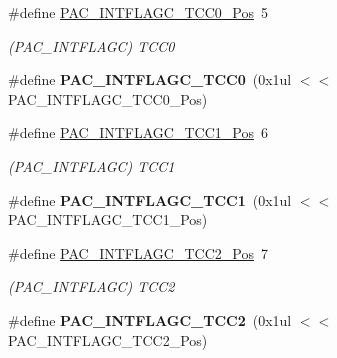 \begin{DoxyCompactItemize}
\item 
\hypertarget{group___s_a_m_l21___p_a_c_gab022b3b9482bc40aca6b6c4abebaa0b5}{}\#define \hyperlink{group___s_a_m_l21___p_a_c_gab022b3b9482bc40aca6b6c4abebaa0b5}{P\+A\+C\+\_\+\+I\+N\+T\+F\+L\+A\+G\+C\+\_\+\+T\+C\+C0\+\_\+\+Pos}~5\label{group___s_a_m_l21___p_a_c_gab022b3b9482bc40aca6b6c4abebaa0b5}

\begin{DoxyCompactList}\small\item\em (P\+A\+C\+\_\+\+I\+N\+T\+F\+L\+A\+G\+C) T\+C\+C0 \end{DoxyCompactList}\item 
\hypertarget{group___s_a_m_l21___p_a_c_ga8e4a5edcc7bb260a14be327275a80ea7}{}\#define {\bfseries P\+A\+C\+\_\+\+I\+N\+T\+F\+L\+A\+G\+C\+\_\+\+T\+C\+C0}~(0x1ul $<$$<$ P\+A\+C\+\_\+\+I\+N\+T\+F\+L\+A\+G\+C\+\_\+\+T\+C\+C0\+\_\+\+Pos)\label{group___s_a_m_l21___p_a_c_ga8e4a5edcc7bb260a14be327275a80ea7}

\item 
\hypertarget{group___s_a_m_l21___p_a_c_ga5a1c17d6eeaa208cec4f131e533edd41}{}\#define \hyperlink{group___s_a_m_l21___p_a_c_ga5a1c17d6eeaa208cec4f131e533edd41}{P\+A\+C\+\_\+\+I\+N\+T\+F\+L\+A\+G\+C\+\_\+\+T\+C\+C1\+\_\+\+Pos}~6\label{group___s_a_m_l21___p_a_c_ga5a1c17d6eeaa208cec4f131e533edd41}

\begin{DoxyCompactList}\small\item\em (P\+A\+C\+\_\+\+I\+N\+T\+F\+L\+A\+G\+C) T\+C\+C1 \end{DoxyCompactList}\item 
\hypertarget{group___s_a_m_l21___p_a_c_ga1b8a43f79aeb44cce9f10f28a03b2dd2}{}\#define {\bfseries P\+A\+C\+\_\+\+I\+N\+T\+F\+L\+A\+G\+C\+\_\+\+T\+C\+C1}~(0x1ul $<$$<$ P\+A\+C\+\_\+\+I\+N\+T\+F\+L\+A\+G\+C\+\_\+\+T\+C\+C1\+\_\+\+Pos)\label{group___s_a_m_l21___p_a_c_ga1b8a43f79aeb44cce9f10f28a03b2dd2}

\item 
\hypertarget{group___s_a_m_l21___p_a_c_ga2a6694132bd55f596d80a23a5098e7a6}{}\#define \hyperlink{group___s_a_m_l21___p_a_c_ga2a6694132bd55f596d80a23a5098e7a6}{P\+A\+C\+\_\+\+I\+N\+T\+F\+L\+A\+G\+C\+\_\+\+T\+C\+C2\+\_\+\+Pos}~7\label{group___s_a_m_l21___p_a_c_ga2a6694132bd55f596d80a23a5098e7a6}

\begin{DoxyCompactList}\small\item\em (P\+A\+C\+\_\+\+I\+N\+T\+F\+L\+A\+G\+C) T\+C\+C2 \end{DoxyCompactList}\item 
\hypertarget{group___s_a_m_l21___p_a_c_gaacd78e702a73a03226f4bc7e7495cdcb}{}\#define {\bfseries P\+A\+C\+\_\+\+I\+N\+T\+F\+L\+A\+G\+C\+\_\+\+T\+C\+C2}~(0x1ul $<$$<$ P\+A\+C\+\_\+\+I\+N\+T\+F\+L\+A\+G\+C\+\_\+\+T\+C\+C2\+\_\+\+Pos)\label{group___s_a_m_l21___p_a_c_gaacd78e702a73a03226f4bc7e7495cdcb}


\end{DoxyCompactItemize}
